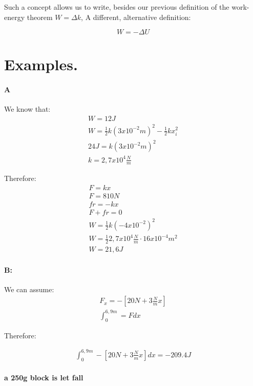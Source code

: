 \documentclass[11pt,fleqn]{book} %
\begin{document}
Such a concept allows us to write, besides our previous definition of the work-energy theorem $W = \Delta k$, A
different, alternative definition:

\begin{equation}
    W = - \Delta U
\end{equation}



\section{Examples.}

\paragraph{A}

We know that:
\begin{gather}
    W = 12J\\
    W = \frac{1}{2} k (3 x 10^{-2}m)^2 - \frac{1}{2} k x_i^2\\
    24J = k(3 x 10^{-2}m)^2\\
    k = 2,7 x 10^4 \frac{N}{m}
\end{gather}

Therefore:
\begin{gather}
    F = kx\\
    F = 810 N\\
    fr = -kx\\
    F + fr = 0\\
    W = \frac{1}{2} k (-4 x 10^{-2})^2\\
    W = \frac{1}{2} 2,7 x 10^4 \frac{N}{m} \cdot 16 x 10^{-4} m^2\\
    W = 21,6 J 
\end{gather}

\paragraph{B:}

We can assume:
\begin{gather}
    F_x = -[20N + 3 \frac{N}{m} x]\\
    \int_0^{6,9m} = F dx
\end{gather}

Therefore:

\begin{gather}
    \int_0^{6,9m} -[20N + 3 \frac{N}{m} x] dx = -209.4 J
\end{gather}

\paragraph*{a 250g block is let fall }
\end{document}
